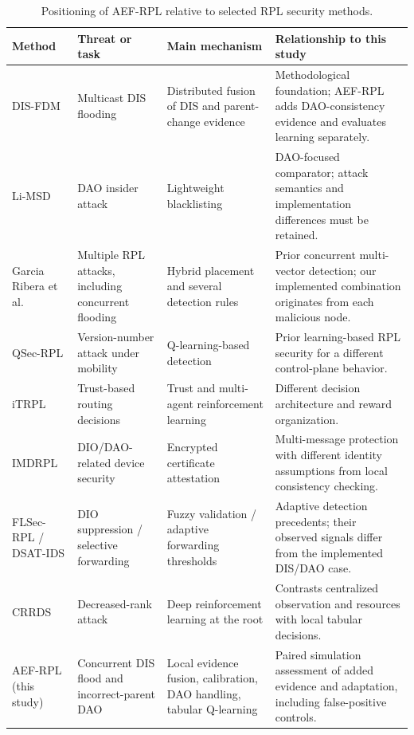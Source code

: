 \documentclass[journal]{IEEEtran}
\begin{document}
\begin{table}[t]
\caption{Positioning of AEF-RPL relative to selected RPL security methods.}
\label{tab:positioning}
\centering
\footnotesize
\setlength{\tabcolsep}{5pt}
\renewcommand{\arraystretch}{1.16}
\begin{tabularx}{\textwidth}{@{}p{}p{}p{}X@{}}
\toprule
Method & Threat or task & Main mechanism & Relationship to this study \\
\midrule
DIS-FDM \cite{prajisha2025} & Multicast DIS flooding & Distributed fusion of DIS and parent-change evidence & Methodological foundation; AEF-RPL adds DAO-consistency evidence and evaluates learning separately. \\
Li-MSD \cite{limsd2024} & DAO insider attack & Lightweight blacklisting & DAO-focused comparator; attack semantics and implementation differences must be retained. \\
Garcia Ribera et al.\ \cite{garciaribera2022} & Multiple RPL attacks, including concurrent flooding & Hybrid placement and several detection rules & Prior concurrent multi-vector detection; our implemented combination originates from each malicious node. \\
QSec-RPL \cite{qsecrpl2023} & Version-number attack under mobility & Q-learning-based detection & Prior learning-based RPL security for a different control-plane behavior. \\
iTRPL \cite{itrpl2024} & Trust-based routing decisions & Trust and multi-agent reinforcement learning & Different decision architecture and reward organization. \\
IMDRPL \cite{imdrpl2023} & DIO/DAO-related device security & Encrypted certificate attestation & Multi-message protection with different identity assumptions from local consistency checking. \\
FLSec-RPL / DSAT-IDS \cite{flsecrpl2024,dsatids2024} & DIO suppression / selective forwarding & Fuzzy validation / adaptive forwarding thresholds & Adaptive detection precedents; their observed signals differ from the implemented DIS/DAO case. \\
CRRDS \cite{haqdad2026} & Decreased-rank attack & Deep reinforcement learning at the root & Contrasts centralized observation and resources with local tabular decisions. \\
AEF-RPL (this study) & Concurrent DIS flood and incorrect-parent DAO & Local evidence fusion, calibration, DAO handling, tabular Q-learning & Paired simulation assessment of added evidence and adaptation, including false-positive controls. \\
\bottomrule
\end{tabularx}
\end{table}
\end{document}
